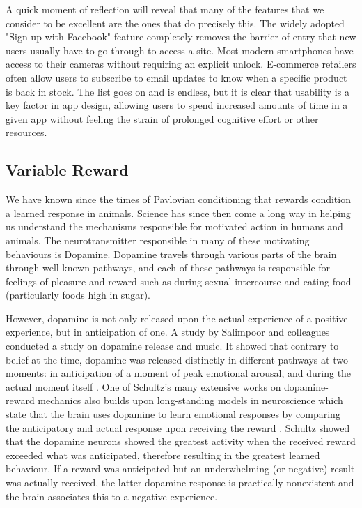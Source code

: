 A quick moment of reflection will reveal that many of the features that we consider to be excellent are the ones that do precisely this. The widely adopted "Sign up with Facebook" feature completely removes the barrier of entry that new users usually have to go through to access a site. Most modern smartphones have access to their cameras without requiring an explicit unlock. E-commerce retailers often allow users to subscribe to email updates to know when a specific product is back in stock. The list goes on and is endless, but it is clear that usability is a key factor in app design, allowing users to spend increased amounts of time in a given app without feeling the strain of prolonged cognitive effort or other resources.

\subsection{Variable Reward}
We have known since the times of Pavlovian conditioning that rewards condition a learned response in animals. Science has since then come a long way in helping us understand the mechanisms responsible for motivated action in humans and animals. The neurotransmitter responsible in many of these motivating behaviours is Dopamine. Dopamine travels through various parts of the brain through well-known pathways, and each of these pathways is responsible for feelings of pleasure and reward such as during sexual intercourse and eating food (particularly foods high in sugar).

However, dopamine is not only released upon the actual experience of a positive experience, but in anticipation of one. A study by Salimpoor and colleagues conducted a study on dopamine release and music. It showed that contrary to belief at the time, dopamine was released distinctly in different pathways at two moments: in anticipation of a moment of peak emotional arousal, and during the actual moment itself \cite{salimpoor2011anatomically}. One of Schultz's many extensive works on dopamine-reward mechanics also builds upon long-standing models in neuroscience which state that the brain uses dopamine to learn emotional responses by comparing the anticipatory and actual response upon receiving the reward \cite{schultz2016dopamine}. Schultz showed that the dopamine neurons showed the greatest activity when the received reward exceeded what was anticipated, therefore resulting in the greatest learned behaviour. If a reward was anticipated but an underwhelming (or negative) result was actually received, the latter dopamine response is practically nonexistent and the brain associates this to a negative experience.

